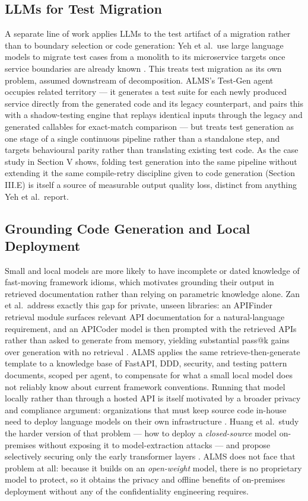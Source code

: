 \documentclass[conference]{IEEEtran}
\begin{document}
\subsection{LLMs for Test Migration}

A separate line of work applies LLMs to the test artifact of a migration rather than to boundary selection or code generation: Yeh et al.\ use large language models to migrate test cases from a monolith to its microservice targets once service boundaries are already known \cite{yeh2024}. This treats test migration as its own problem, assumed downstream of decomposition. ALMS's Test-Gen agent occupies related territory --- it generates a test suite for each newly produced service directly from the generated code and its legacy counterpart, and pairs this with a shadow-testing engine that replays identical inputs through the legacy and generated callables for exact-match comparison --- but treats test generation as one stage of a single continuous pipeline rather than a standalone step, and targets behavioural parity rather than translating existing test code. As the case study in Section V shows, folding test generation into the same pipeline without extending it the same compile-retry discipline given to code generation (Section III.E) is itself a source of measurable output quality loss, distinct from anything Yeh et al.\ report.

\subsection{Grounding Code Generation and Local Deployment}

Small and local models are more likely to have incomplete or dated knowledge of fast-moving framework idioms, which motivates grounding their output in retrieved documentation rather than relying on parametric knowledge alone. Zan et al.\ address exactly this gap for private, unseen libraries: an APIFinder retrieval module surfaces relevant API documentation for a natural-language requirement, and an APICoder model is then prompted with the retrieved APIs rather than asked to generate from memory, yielding substantial pass@k gains over generation with no retrieval \cite{zan2023}. ALMS applies the same retrieve-then-generate template to a knowledge base of FastAPI, DDD, security, and testing pattern documents, scoped per agent, to compensate for what a small local model does not reliably know about current framework conventions. Running that model locally rather than through a hosted API is itself motivated by a broader privacy and compliance argument: organizations that must keep source code in-house need to deploy language models on their own infrastructure \cite{huang2024}. Huang et al.\ study the harder version of that problem --- how to deploy a \textit{closed-source} model on-premises without exposing it to model-extraction attacks --- and propose selectively securing only the early transformer layers \cite{huang2024}. ALMS does not face that problem at all: because it builds on an \textit{open-weight} model, there is no proprietary model to protect, so it obtains the privacy and offline benefits of on-premises deployment without any of the confidentiality engineering \cite{huang2024} requires.
\end{document}
